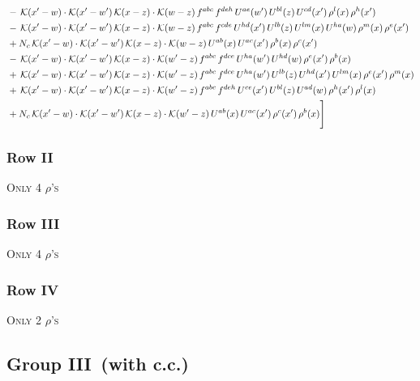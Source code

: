 \documentclass[9pt]{article}
\numberwithin{equation}{section}
\begin{document}
\begin{align}
& -\,\mathcal{K}(x'-w)\cdot\mathcal{K}(x'-w')\,\mathcal{K}(x-z)\cdot\mathcal{K}(w-z)\,f^{abc}\,f^{deh}\,U^{ae}(w')\,U^{bl}(z)\,U^{cd}(x')\,\rho^{l}(x)\,\rho^{h}(x')\notag\\
& -\,\mathcal{K}(x'-w)\cdot\mathcal{K}(x'-w')\,\mathcal{K}(x-z)\cdot\mathcal{K}(w-z)\,f^{abc}\,f^{cde}\,U^{hd}(x')\,U^{lb}(z)\,U^{lm}(x)\,U^{ha}(w)\,\rho^{m}(x)\,\rho^{e}(x')\notag\\
& +N_{c}\,\mathcal{K}(x'-w)\cdot\mathcal{K}(x'-w')\,\mathcal{K}(x-z)\cdot\mathcal{K}(w-z)\,U^{ab}(x)\,U^{ac}(x')\,\rho^{b}(x)\,\rho^{c}(x')\notag\\
& -\,\mathcal{K}(x'-w)\cdot\mathcal{K}(x'-w')\,\mathcal{K}(x-z)\cdot\mathcal{K}(w'-z)\,f^{abc}\,f^{dce}\,U^{ha}(w')\,U^{hd}(w)\,\rho^{e}(x')\,\rho^{b}(x)\notag\\
& +\,\mathcal{K}(x'-w)\cdot\mathcal{K}(x'-w')\,\mathcal{K}(x-z)\cdot\mathcal{K}(w'-z)\,f^{abc}\,f^{dce}\,U^{ha}(w')\,U^{lb}(z)\,U^{hd}(x')\,U^{lm}(x)\,\rho^{e}(x')\,\rho^{m}(x)\notag\\
& +\,\mathcal{K}(x'-w)\cdot\mathcal{K}(x'-w')\,\mathcal{K}(x-z)\cdot\mathcal{K}(w'-z)\,f^{abc}\,f^{deh}\,U^{ce}(x')\,U^{bl}(z)\,U^{ad}(w)\,\rho^{h}(x')\,\rho^{l}(x)\notag\\
& +N_{c}\,\mathcal{K}(x'-w)\cdot\mathcal{K}(x'-w')\,\mathcal{K}(x-z)\cdot\mathcal{K}(w'-z)\,U^{ab}(x)\,U^{ac}(x')\,\rho^{c}(x')\,\rho^{b}(x)\Bigg]
\end{align}
\subsubsection{Row II}
\textsc{Only 4 $\rho$'s}
\subsubsection{Row III}
\textsc{Only 4 $\rho$'s}
\subsubsection{Row IV}
\textsc{Only 2 $\rho$'s}
\subsection{Group III\, (with c.c.)}
\end{document}
